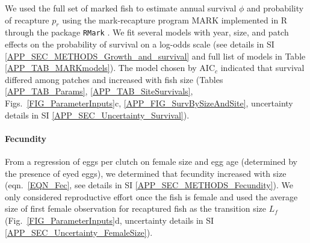 \documentclass[12pt, oneside]{article}   	%
\begin{document}

We used the full set of marked fish to estimate annual survival $\phi$ and probability of recapture $p_r$ using the mark-recapture program MARK implemented in R through the package \texttt{RMark} \citep{RMark_Laake2013}. We fit several models with year, size, and patch effects on the probability of survival on a log-odds scale (see details in SI \ref{APP_SEC_METHODS_Growth_and_survival} and full list of models in Table \ref{APP_TAB_MARKmodels}). The model chosen by $\text{AIC}_c$ indicated that survival differed among patches and increased with fish size (Tables \ref{APP_TAB_Params}, \ref{APP_TAB_SiteSurvivals}, Figs.\ \ref{FIG_ParameterInputs}c, \ref{APP_FIG_SurvBySizeAndSite}, uncertainty details in SI \ref{APP_SEC_Uncertainty_Survival}). 

\paragraph*{Fecundity}

From a regression of eggs per clutch on female size and egg age (determined by the presence of eyed eggs), we determined that fecundity increased with size (eqn.\ \ref{EQN_Fec}, see details in SI \ref{APP_SEC_METHODS_Fecundity}). We only considered reproductive effort once the fish is female and used the average size of first female observation for recaptured fish as the transition size $L_f$ (Fig.\ \ref{FIG_ParameterInputs}d, uncertainty details in SI \ref{APP_SEC_Uncertainty_FemaleSize}).


\end{document}

